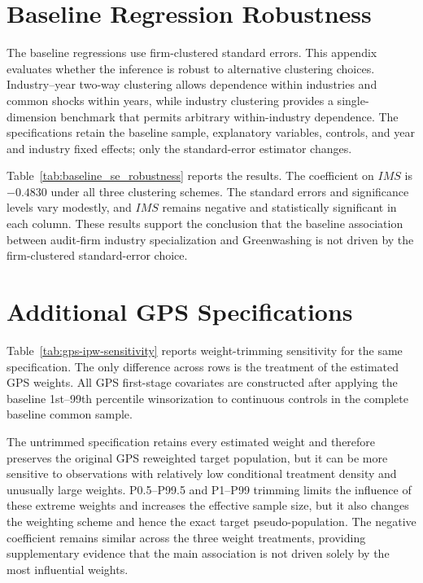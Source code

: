\documentclass[11pt]{article}
\begin{document}
\section{Baseline Regression Robustness}
\label{sec:baseline-robustness}

The baseline regressions use firm-clustered standard errors. 
This appendix evaluates whether the inference is robust to alternative clustering choices. 
Industry--year two-way clustering allows dependence within industries and common shocks within years, while industry clustering provides a single-dimension benchmark that permits arbitrary within-industry dependence. 
The specifications retain the baseline sample, explanatory variables, controls, and year and industry fixed effects; only the standard-error estimator changes.

Table~\ref{tab:baseline_se_robustness} reports the results. The coefficient on \(IMS\) is \(-0.4830\) under all three clustering schemes. The standard errors and significance levels vary modestly, and \(IMS\) remains negative and statistically significant in each column. These results support the conclusion that the baseline association between audit-firm industry specialization and Greenwashing is not driven by the firm-clustered standard-error choice.



\section{Additional GPS Specifications}
\label{sec:gps-appendix}

Table~\ref{tab:gps-ipw-sensitivity} reports weight-trimming sensitivity for the same specification. 
The only difference across rows is the treatment of the estimated GPS weights. All GPS first-stage covariates are constructed after applying the baseline 1st--99th percentile winsorization to continuous controls in the complete baseline common sample.

The untrimmed specification retains every estimated weight and therefore preserves the original GPS reweighted target population, but it can be more sensitive to observations with relatively low conditional treatment density and unusually large weights. 
P0.5--P99.5 and P1--P99 trimming limits the influence of these extreme weights and increases the effective sample size, but it also changes the weighting scheme and hence the exact target pseudo-population. 
The negative coefficient remains similar across the three weight treatments, providing supplementary evidence that the main association is not driven solely by the most influential weights.
\end{document}
